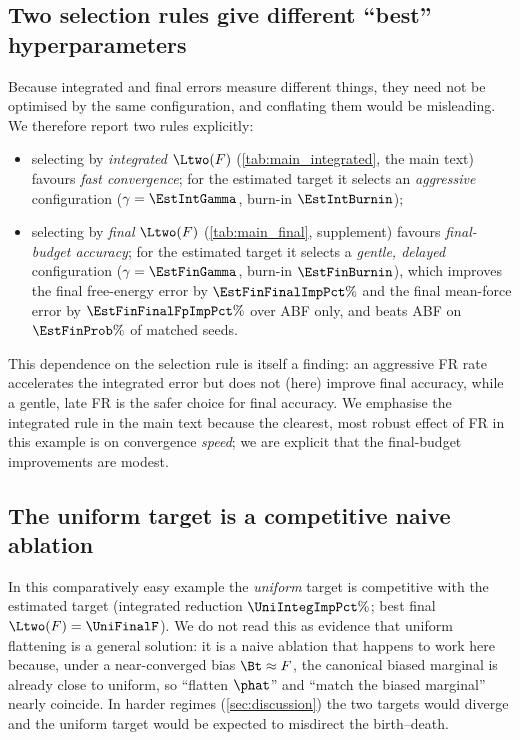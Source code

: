 \subsection{Two selection rules give different ``best'' hyperparameters}
\label{sec:selection}
Because integrated and final errors measure different things, they need not be
optimised by the same configuration, and conflating them would be misleading.
We therefore report two rules explicitly:
\begin{itemize}
  \item selecting by \emph{integrated} $\Ltwo(F)$
        (\cref{tab:main_integrated}, the main text) favours \emph{fast
        convergence}; for the estimated target it selects an
        \emph{aggressive} configuration ($\gamma=\EstIntGamma$, burn-in
        $\EstIntBurnin$);
  \item selecting by \emph{final} $\Ltwo(F)$
        (\cref{tab:main_final}, supplement) favours \emph{final-budget
        accuracy}; for the estimated target it selects a \emph{gentle, delayed}
        configuration ($\gamma=\EstFinGamma$, burn-in $\EstFinBurnin$), which
        improves the final free-energy error by $\EstFinFinalImpPct\%$ and the
        final mean-force error by $\EstFinFinalFpImpPct\%$ over ABF only, and
        beats ABF on $\EstFinProb\%$ of matched seeds.
\end{itemize}
This dependence on the selection rule is itself a finding: an aggressive FR rate
accelerates the integrated error but does not (here) improve final accuracy,
while a gentle, late FR is the safer choice for final accuracy. We emphasise the
integrated rule in the main text because the clearest, most robust effect of FR
in this example is on convergence \emph{speed}; we are explicit that the
final-budget improvements are modest.



\subsection{The uniform target is a competitive naive ablation}
In this comparatively easy example the \emph{uniform} target is competitive with
the estimated target (integrated reduction $\UniIntegImpPct\%$; best final
$\Ltwo(F)=\UniFinalF$). We do not read this as evidence that uniform flattening
is a general solution: it is a naive ablation that happens to work here because,
under a near-converged bias $\Bt\approx F$, the canonical biased marginal is
already close to uniform, so ``flatten $\phat$'' and ``match the biased
marginal'' nearly coincide. In harder regimes (\cref{sec:discussion}) the two
targets would diverge and the uniform target would be expected to misdirect the
birth--death.

